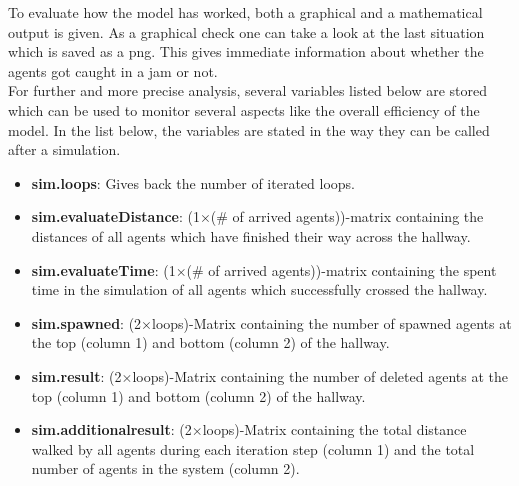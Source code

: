 
\noi To evaluate how the model has worked, both a graphical and a mathematical output is given. As a graphical check one can take a look at the last situation which is saved as a png. This gives immediate information about whether the agents got caught in a jam or not.\\
For further and more precise analysis, several variables listed below are stored which can be used to monitor several aspects like the overall efficiency of the model. In the list below, the variables are stated in the way they can be called after a simulation.
\begin{itemize}
	\item \textbf{sim.loops}: Gives back the number of iterated loops.
	\item \textbf{sim.evaluateDistance}: (1$\times$(\# of arrived agents))-matrix containing the distances of all agents which have finished their way across the hallway.
	\item \textbf{sim.evaluateTime}: (1$\times$(\# of arrived agents))-matrix containing the spent time in the simulation of all agents which successfully crossed the hallway.
	\item \textbf{sim.spawned}: (2$\times$loops)-Matrix containing the number of spawned agents at the top (column 1) and bottom (column 2) of the hallway.
	\item \textbf{sim.result}: (2$\times$loops)-Matrix containing the number of deleted agents at the top (column 1) and bottom (column 2) of the hallway.
	\item \textbf{sim.additionalresult}: (2$\times$loops)-Matrix containing the total distance walked by all agents during each iteration step (column 1) and the total number of agents in the system (column 2).
\end{itemize}
